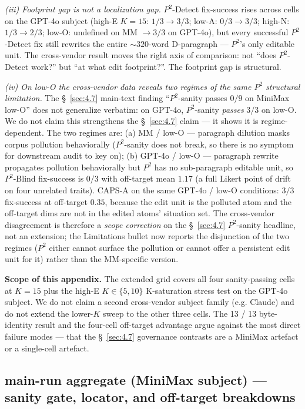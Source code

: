 \textit{(iii) Footprint gap is not a localization gap.} $P^{\!2}$-Detect fix-success rises across cells on the GPT-4o subject (high-E $K=15$: $1/3 \to 3/3$; low-A: $0/3 \to 3/3$; high-N: $1/3 \to 2/3$; low-O: undefined on MM $\to 3/3$ on GPT-4o), but every successful $P^{\!2}$-Detect fix still rewrites the entire $\sim 320$-word D-paragraph --- $P^{\!2}$'s only editable unit. The cross-vendor result moves the right axis of comparison: not ``does $P^{\!2}$-Detect work?'' but ``at what edit footprint?''. The footprint gap is structural.

\textit{(iv) On low-O the cross-vendor data reveals two regimes of the same $P^{\!2}$ structural limitation.} The \S~\ref{sec:4.7} main-text finding ``$P^{\!2}$-sanity passes $0/9$ on MiniMax low-O'' does not generalize verbatim: on GPT-4o, $P^{\!2}$-sanity \textit{passes} $3/3$ on low-O. We do not claim this strengthens the \S~\ref{sec:4.7} claim --- it shows it is regime-dependent. The two regimes are: (a) MM / low-O --- paragraph dilution masks corpus pollution behaviorally ($P^{\!2}$-sanity does not break, so there is no symptom for downstream audit to key on); (b) GPT-4o / low-O --- paragraph rewrite propagates pollution behaviorally but $P^{\!2}$ has no sub-paragraph editable unit, so $P^{\!2}$-Blind fix-success is $0/3$ with off-target mean $1.17$ (a full Likert point of drift on four unrelated traits). CAPS-A on the same GPT-4o / low-O conditions: $3/3$ fix-success at off-target $0.35$, because the edit unit is the polluted atom and the off-target dims are not in the edited atoms' situation set. The cross-vendor disagreement is therefore a \textit{scope correction} on the \S~\ref{sec:4.7} $P^{\!2}$-sanity headline, not an extension; the Limitations bullet now reports the disjunction of the two regimes ($P^{\!2}$ either cannot surface the pollution or cannot offer a persistent edit unit for it) rather than the MM-specific version.

\textbf{Scope of this appendix.} The extended grid covers all four sanity-passing cells at $K=15$ plus the high-E $K\in\{5,10\}$ K-saturation stress test on the GPT-4o subject. We do not claim a second cross-vendor subject family (e.g. Claude) and do not extend the lower-$K$ sweep to the other three cells. The 13 / 13 byte-identity result and the four-cell off-target advantage argue against the most direct failure modes --- that the \S~\ref{sec:4.7} governance contrasts are a MiniMax artefact or a single-cell artefact.

\subsection{main-run aggregate (MiniMax subject) --- sanity gate, locator, and off-target breakdowns}
\label{app:A.12}

